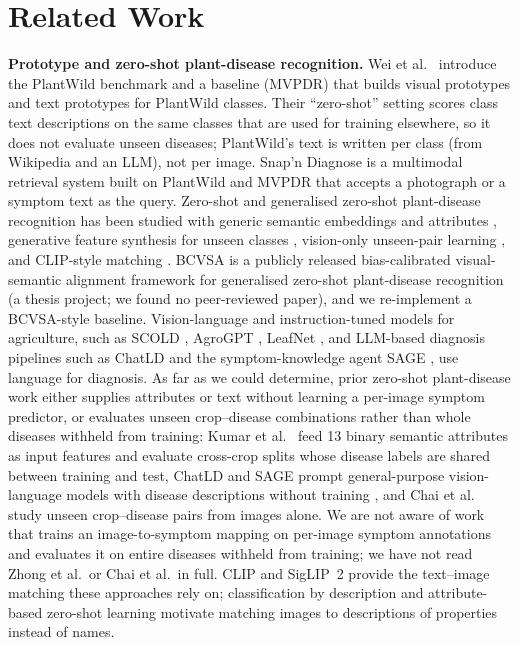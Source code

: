 \documentclass[11pt]{article}
\begin{document}
\section{Related Work}\label{sec:related}
\textbf{Prototype and zero-shot plant-disease recognition.} Wei et al.\ \cite{mvpdr} introduce the PlantWild benchmark and a baseline (MVPDR) that builds visual prototypes and text prototypes for PlantWild classes. Their ``zero-shot'' setting scores class text descriptions on the same classes that are used for training elsewhere, so it does not evaluate unseen diseases; PlantWild's text is written per class (from Wikipedia and an LLM), not per image. Snap'n Diagnose \cite{snapn} is a multimodal retrieval system built on PlantWild and MVPDR that accepts a photograph or a symptom text as the query. Zero-shot and generalised zero-shot plant-disease recognition has been studied with generic semantic embeddings and attributes \cite{kumar2024}, generative feature synthesis for unseen classes \cite{zhong2020}, vision-only unseen-pair learning \cite{chai2024}, and CLIP-style matching \cite{benabbas2025}. BCVSA \cite{bcvsa} is a publicly released bias-calibrated visual-semantic alignment framework for generalised zero-shot plant-disease recognition (a thesis project; we found no peer-reviewed paper), and we re-implement a BCVSA-style baseline. Vision-language and instruction-tuned models for agriculture, such as SCOLD \cite{scold}, AgroGPT \cite{agrogpt}, LeafNet \cite{leafnet}, and LLM-based diagnosis pipelines such as ChatLD \cite{chatld} and the symptom-knowledge agent SAGE \cite{sage}, use language for diagnosis. As far as we could determine, prior zero-shot plant-disease work either supplies attributes or text without learning a per-image symptom predictor, or evaluates unseen crop--disease combinations rather than whole diseases withheld from training: Kumar et al.\ \cite{kumar2024} feed 13 binary semantic attributes as input features and evaluate cross-crop splits whose disease labels are shared between training and test, ChatLD and SAGE prompt general-purpose vision-language models with disease descriptions without training \cite{chatld,sage}, and Chai et al.\ \cite{chai2024} study unseen crop--disease pairs from images alone. We are not aware of work that trains an image-to-symptom mapping on per-image symptom annotations and evaluates it on entire diseases withheld from training; we have not read Zhong et al.\ or Chai et al.\ in full. CLIP \cite{clip} and SigLIP~2 \cite{siglip2} provide the text--image matching these approaches rely on; classification by description \cite{cupl,menon2023} and attribute-based zero-shot learning \cite{lampert2014} motivate matching images to descriptions of properties instead of names.
\end{document}
